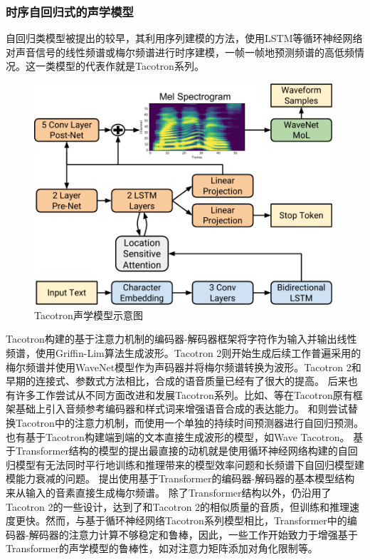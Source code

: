 \subsubsection{时序自回归式的声学模型}
自回归类模型被提出的较早，其利用序列建模的方法，使用LSTM等循环神经网络对声音信号的线性频谱或梅尔频谱进行时序建模，一帧一帧地预测频谱的高低频情况。这一类模型的代表作就是Tacotron系列。
\begin{figure}[ht]
  \includegraphics[width=0.99\textwidth]{figure/related/tacotron2.pdf}
  \caption{Tacotron声学模型示意图}
\end{figure}
Tacotron\citep{tacotron}构建的基于注意力机制的编码器-解码器框架将字符作为输入并输出线性频谱，使用Griffin-Lim算法\citep{GriffinLim}生成波形。Tacotron 2\citep{shen2018natural}则开始生成后续工作普遍采用的梅尔频谱并使用WaveNet\citep{vanwavenet}模型作为声码器并将梅尔频谱转换为波形。Tacotron 2和早期的连接式、参数式方法相比，合成的语音质量已经有了很大的提高。
后来也有许多工作尝试从不同方面改进和发展Tacotron系列。比如\citet{gsttacotron}、\citet{reftacotron}等在Tacotron原有框架基础上引入音频参考编码器和样式词来增强语音合成的表达能力。
\citet{nonattentivetacotron}和\citet{durian}则尝试替换Tacotron中的注意力机制，而使用一个单独的持续时间预测器进行自回归预测。
也有基于Tacotron构建端到端的文本直接生成波形的模型，如Wave Tacotron\citep{wavetacotron}。
基于Transformer结构的模型的提出最直接的动机就是使用循环神经网络构建的自回归模型有无法同时平行地训练和推理带来的模型效率问题和长频谱下自回归模型建模能力衰减的问题。
\citet{transformertts}提出使用基于Transformer的编码器-解码器的基本模型结构来从输入的音素直接生成梅尔频谱。
\citet{transformertts}除了Transformer结构以外，仍沿用了Tacotron 2的一些设计，达到了和Tacotron 2的相似质量的音质，但训练和推理速度更快。然而，与基于循环神经网络Tacotron系列模型相比，Transformer中的编码器-解码器的注意力计算不够稳定和鲁棒，因此，一些工作开始致力于增强基于Transformer的声学模型的鲁棒性，如对注意力矩阵添加对角化限制\citep{robutrans}等。
